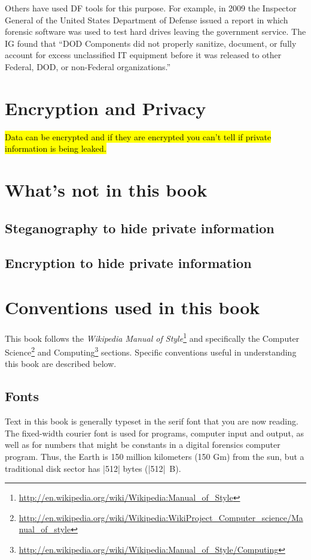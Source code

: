 Others have used DF tools for this purpose. For example, in 2009 the
Inspector General of the United States Department of Defense issued a
report in which forensic software was used to test hard drives leaving
the government service. The IG found that ``DOD Components did not
properly sanitize, document, or fully account for excess unclassified
IT equipment before it was released to other Federal, DOD, or
non-Federal organizations.''\cite{D-2009-104}




\section{Encryption and Privacy}
\hl{Data can be encrypted and if they are encrypted you can't tell if
  private information is being leaked.}

\section{What's not in this book}
\subsection{Steganography to hide private information} 
\subsection{Encryption to hide private information} 


\section{Conventions used in this book}
This book follows the \emph{Wikipedia Manual of
  Style}\footnote{\url{http://en.wikipedia.org/wiki/Wikipedia:Manual_of_Style}}
and specifically the Computer
Science\footnote{\url{http://en.wikipedia.org/wiki/Wikipedia:WikiProject_Computer_science/Manual_of_style}}
  and
  Computing\footnote{\url{http://en.wikipedia.org/wiki/Wikipedia:Manual_of_Style/Computing}}
  sections. Specific conventions useful in understanding this book are
  described below.

\subsection{Fonts}

Text in this book is generally typeset in the serif font that you are
now reading. The fixed-width courier font is used for programs,
computer input and output, as well as for numbers that might
be constants in a digital forensics computer program. Thus,
the Earth is 150 million kilometers (150 Gm) from the sun, but a
traditional disk sector has |512| bytes (|512|~B).

